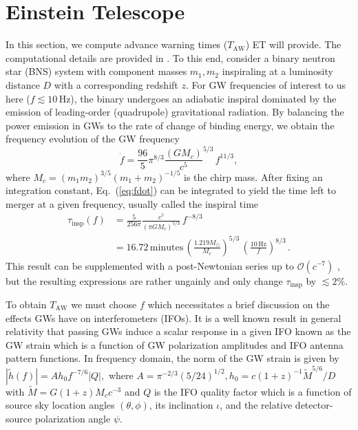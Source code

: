 \documentclass{aa}
\newcommand{\be}{\begin{equation}}
\newcommand{\ee}{\end{equation}}
\newcommand{\f}{\frac}
\newcommand{\nn}{\nonumber}
\newcommand{\ord}{\mathcal{O}}
\begin{document}
\section{Einstein Telescope}
\label{sect:et}
In this section, we compute advance warning times ($T_\text{AW}$) ET will provide.
The computational details are provided in \cite{Akcay18}.
To this end, consider a binary neutron star (BNS) system with component masses
$m_1, m_2$ inspiraling at a luminosity distance $D$ with a corresponding redshift $z$. For GW frequencies of interest to us here ($f \lesssim 10\,$Hz), the binary undergoes an adiabatic inspiral dominated by
the emission of leading-order (quadrupole)
gravitational radiation. By balancing the
power emission in GWs to the rate of change of binding energy, we obtain the frequency evolution of the GW frequency
%
\be
\dot{f} = \f{96}{5}\pi^{8/3} \f{(G M_c)}{c^5}^{5/3}\, f^{11/3}, \label{eq:fdot}
\ee
where $M_c  = {(m_1 m_2)^{3/5}}{(m_1+m_2)^{-1/5}} $ is the chirp mass.
After fixing an integration constant, Eq.~(\ref{eq:fdot})
can be integrated to yield the time left to merger at a given frequency, usually called the inspiral time
%
\begin{align}
\tau_\text{insp}(f) &= \f{5}{256\pi}\f{c^5}{(\pi G M_c)^{5/3}} \,f^{-8/3}\nn\\
&=16.72\,\text{minutes} \, \left(\f{1.219 M_\odot}{M_c}\right)^{5/3}\,\left(\f{10\,\text{Hz}}{f}\right)^{8/3}
\label{eq:tau_insp}\, .
\end{align}
%
This result can be supplemented with a post-Newtonian series up to $\ord(c^{-7})$ \citep{Blanchet_LRR}, but the resulting expressions
are rather ungainly and only change $\tau_\text{insp}$ by $\lesssim 2\%$.

To obtain $T_\text{AW}$ we must choose $f$
which necessitates a brief discussion on the
effects GWs have on interferometers (IFOs).
It is a well known result in general relativity that passing GWs induce a scalar response in a given IFO known as the GW strain which is a function of GW polarization amplitudes and IFO 
antenna pattern functions. In frequency domain, the norm of the GW strain is given by
%
$|\tilde{h}(f)|=A h_0 f^{-7/6} |Q|,$ %
%
where $A= \pi^{-2/3}(5/24)^{1/2}, h_0 = c  (1+z)^{-1}\tilde{M}^{5/6}/D$ with $\tilde{M}= G  (1+z)M_c c^{-3}$ and $Q$ is the IFO quality factor which is a function of source sky location angles $(\theta,\phi)$, its inclination $\iota$, and the relative detector-source polarization angle $\psi$.
\end{document}
